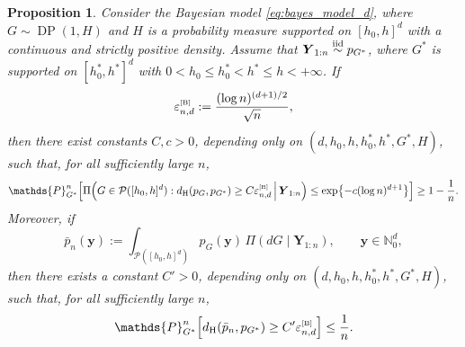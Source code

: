 \documentclass[twoside,12pt]{article}
\def\simiid{\stackrel{\mbox{\scriptsize{iid}}}{\sim}}
\renewcommand{\P}{\mathds{P}}
\newtheorem{prp}[thm]{Proposition}
\begin{document}
\begin{prp}\label{pcrdp_d}
Consider the Bayesian model \eqref{eq:bayes_model_d}, where $G\sim\operatorname{DP}(1,H)$ and $H$ is a probability measure supported on $[h_{0},h]^d$ with a continuous and strictly positive density. Assume that $\boldsymbol{Y}_{1:n}\simiid p_{G^\ast}$, where $G^{\ast}$ is supported on $[h_0^\ast,h^\ast]^d$ with $0<h_0\leq h_0^\ast<h^\ast\leq h<+\infty$. If \begin{equation}\label{rate_dp_d} \varepsilon_{n,d}^{\text{\tiny{[B]}}}:= \frac{(\log n)^{(d+1)/2}}{\sqrt n}, \end{equation} then there exist constants $C,c>0$, depending only on $(d,h_0,h,h_0^\ast,h^\ast,G^\ast,H)$, such that, for all sufficiently large $n$,
\begin{equation}\label{pcr_dp_d_1}
\P_{G^\ast}^n\!\left[\Pi\!\left(G\in\mathcal P([h_{0},h]^d):d_{\mathrm H}(p_G,p_{G^\ast})\ge C\varepsilon_{n,d}^{\text{\tiny{[B]}}}\,\middle|\,\boldsymbol Y_{1:n}\right)\le\exp\!\left\{-c(\log n)^{d+1}\right\}\right]\ge 1-\frac{1}{n}.
\end{equation}
Moreover, if
\begin{displaymath}
\bar p_n(\boldsymbol y):=\int_{\mathcal P([h_{0},h]^d)}p_G(\boldsymbol y)\,\Pi(dG\mid \boldsymbol Y_{1:n}),\qquad\boldsymbol y\in\mathbb N_0^d,
\end{displaymath}
then there exists a constant $C'>0$, depending only on $(d,h_0,h,h_0^\ast,h^\ast,G^\ast,H)$, such that, for all sufficiently large $n$,
\begin{equation}\label{pcr_dp_d_2}
\P_{G^\ast}^n\!\left[d_{\mathrm H}(\bar p_n,p_{G^\ast})\ge C'\varepsilon_{n,d}^{\text{\tiny{[B]}}}\right]\le\frac{1}{n}.
\end{equation}
\end{prp}
\end{document}
